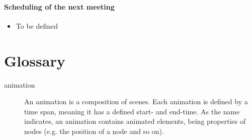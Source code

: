 \documentclass[10pt, openright, notitlepage]{scrreprt}
\begin{document}
\subsubsection{Scheduling of the next meeting}
\label{sec:org8f41f84}

\begin{itemize}
\item To be defined
\end{itemize}

\chapter{Glossary}
\label{sec:orgc17493e}

\begin{description}
\item[{animation}] An animation is a composition of scenes. Each animation is
defined by a time span, meaning it has a defined start- and
end-time. As the name indicates, an animation contains animated
elements, being properties of nodes (e.g. the position of a node
and so on).
\end{description}
\end{document}
